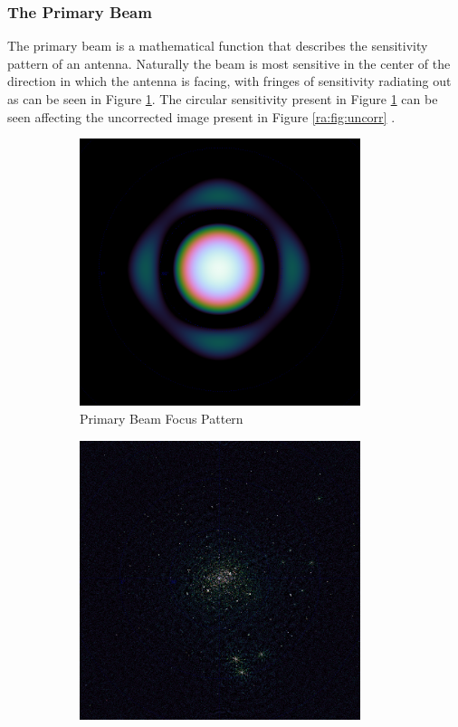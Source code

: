 \subsubsection{The Primary Beam}\label{ra:ssec:tpb}
The primary beam is a mathematical function that describes the sensitivity pattern of an antenna. Naturally the beam is most sensitive in the center of the direction in which the antenna is facing, with fringes of sensitivity radiating out as can be seen in Figure \ref{ra:fig:beam}. The circular sensitivity present in Figure \ref{ra:fig:beam} can be seen affecting the uncorrected image present in Figure \ref{ra:fig:uncorr} \citep{thompson2008interferometry}.
%
\begin{figure}[H]
  \begin{subfigure}{0.45\textwidth}
	\centering
	\includegraphics[width=0.9\textwidth]{Images/beam.png}
	\caption{Primary Beam Focus Pattern}
	\label{ra:fig:beam}
  \end{subfigure}
  \begin{subfigure}{0.45\textwidth}
	\centering
	\includegraphics[width=0.9\textwidth]{Images/uncorrected-image.png}

\end{subfigure}
\end{figure}
